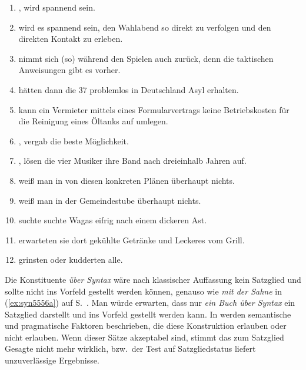 \begin{enumerate}\Lf
  \item {}, wird spannend sein.
  \item \VfTest {} wird es spannend sein, den Wahlabend so direkt zu verfolgen und den direkten Kontakt zu erleben.
  \item \VfTest [Er] nimmt sich (so) während den Spielen auch zurück, denn die taktischen Anweisungen gibt es vorher.
  \item {} hätten dann die 37 problemlos in Deutschland Asyl erhalten.
  \item \VfTest {} kann ein Vermieter mittels eines Formularvertrags keine Betriebskosten für die Reinigung eines Öltanks auf umlegen.
  \item {}, vergab die beste Möglichkeit.
  \item {}, lösen die vier Musiker ihre Band nach dreieinhalb Jahren auf.
  \item \VfTest {} weiß man in von diesen konkreten Plänen überhaupt nichts.
  \item {} weiß man in der Gemeindestube überhaupt nichts.
  \item \VfTest [Um zu helfen] suchte suchte Wagas eifrig nach einem dickeren Ast.
  \item {} erwarteten sie dort gekühlte Getränke und Leckeres vom Grill.
  \item {} grinsten oder kudderten alle.
\end{enumerate}


Die Konstituente \textit{über Syntax} wäre nach klassischer Auffassung kein Satzglied und sollte nicht ins Vorfeld gestellt werden können, genauso wie \textit{mit der Sahne} in (\ref{ex:syn5556a}) auf S.~\pageref{ex:syn5556a}.
Man würde erwarten, dass nur \textit{ein Buch über Syntax} ein Satzglied darstellt und ins Vorfeld gestellt werden kann.
In \citet{Dekuthy2002} werden semantische und pragmatische Faktoren beschrieben, die diese Konstruktion erlauben oder nicht erlauben.
Wenn dieser Sätze akzeptabel sind, stimmt das zum Satzglied Gesagte nicht mehr wirklich, bzw.\ der Test auf Satzgliedstatus liefert unzuverlässige Ergebnisse.

